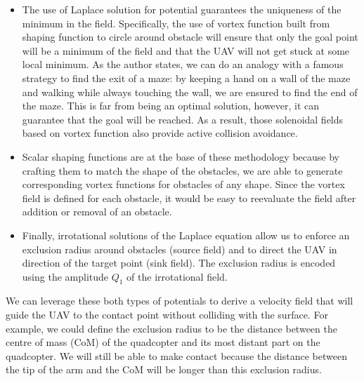 \begin{itemize}
    \item The use of Laplace solution for potential guarantees the uniqueness of the minimum in the field. 
    Specifically, the use of vortex function built from shaping function to circle around obstacle will
    ensure that only the goal point will be a minimum of the field and that the UAV will not get stuck at some local minimum. 
    As the author states, we can do an analogy with a famous strategy to find the exit of a maze: 
    by keeping a hand on a wall of the maze and walking while always touching the wall, we are ensured to find the end of the maze. 
    This is far from being an optimal solution, however, it can guarantee that the goal will be reached. 
    As a result, those solenoidal fields based on vortex function also provide active collision avoidance. 
    \item Scalar shaping functions are at the base of these methodology because by crafting them to match the shape of the obstacles, 
    we are able to generate corresponding vortex functions for obstacles of any shape. 
    Since the vortex field is defined for each obstacle, it would be easy to reevaluate the field after addition or removal of an obstacle.
    \item Finally, irrotational solutions of the Laplace equation allow us to enforce an exclusion radius around obstacles (source field) and to direct the UAV in direction of the target point (sink field).
    The exclusion radius is encoded using the amplitude ${Q}_{1}$ of the irrotational field.
\end{itemize}

We can leverage these both types of potentials to derive a velocity field that will guide the UAV to the contact point without colliding with the surface.
For example, we could define the exclusion radius to be the distance between the centre of mass (CoM) of the quadcopter and its most distant part on the quadcopter. 
We will still be able to make contact because the distance between the tip of the arm and the CoM will be longer than this exclusion radius. 


